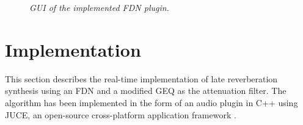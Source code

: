 \documentclass[twoside,a4paper]{article}
\begin{document}
\begin{figure}[ht!]
    \centering
     \hfill
     \hfill
    \caption{\textit{GUI of the implemented FDN plugin.}}
    \label{fig:GUIboth}
\end{figure}


\section{Implementation}\label{sec:implementation}

This section describes the real-time implementation of late reverberation synthesis using an FDN and a modified GEQ as the attenuation filter. The algorithm has been implemented in the form of an audio plugin  in C++ using JUCE, an open-source cross-platform application framework \cite{juce}.
\end{document}
